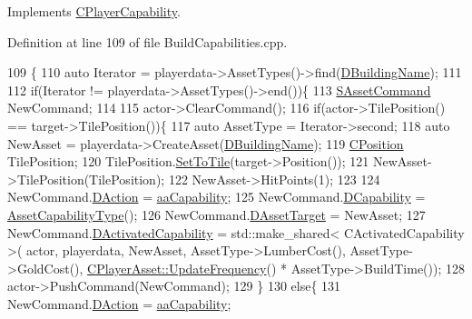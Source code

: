 Implements \hyperlink{classCPlayerCapability_a2ca6fd7fbd9c0178f1cf1d049c63825f}{C\+Player\+Capability}.



Definition at line 109 of file Build\+Capabilities.\+cpp.


\begin{DoxyCode}
109                                                                                                            
                                                               \{
110     \textcolor{keyword}{auto} Iterator = playerdata->AssetTypes()->find(\hyperlink{classCPlayerCapabilityBuildNormal_aae09d6cee5f8e201a0139c9065a5577c}{DBuildingName});
111     
112     \textcolor{keywordflow}{if}(Iterator != playerdata->AssetTypes()->end())\{
113         \hyperlink{structSAssetCommand}{SAssetCommand} NewCommand;
114         
115         actor->ClearCommand();
116         \textcolor{keywordflow}{if}(actor->TilePosition() == target->TilePosition())\{
117             \textcolor{keyword}{auto} AssetType = Iterator->second;
118             \textcolor{keyword}{auto} NewAsset = playerdata->CreateAsset(\hyperlink{classCPlayerCapabilityBuildNormal_aae09d6cee5f8e201a0139c9065a5577c}{DBuildingName});
119             \hyperlink{classCPosition}{CPosition} TilePosition;
120             TilePosition.\hyperlink{classCPosition_ae302aa21792de64c97de29e2cbbfeb94}{SetToTile}(target->Position());
121             NewAsset->TilePosition(TilePosition);
122             NewAsset->HitPoints(1);
123 
124             NewCommand.\hyperlink{structSAssetCommand_a8edd3b3d59a76d5514ba403bc8076a75}{DAction} = \hyperlink{GameDataTypes_8h_ab47668e651a3032cfb9c40ea2d60d670acf9fb164e8abd71c71f4a8c7fda360d4}{aaCapability};
125             NewCommand.\hyperlink{structSAssetCommand_a734ea7c6847457b437360f333f570ff9}{DCapability} = \hyperlink{classCPlayerCapability_a433bb196cd6ab6a932f1cac102b3aa98}{AssetCapabilityType}();
126             NewCommand.\hyperlink{structSAssetCommand_a3d9b43f6e59c386c48c41a65448a0c39}{DAssetTarget} = NewAsset;
127             NewCommand.\hyperlink{structSAssetCommand_ad8beda19520811cc70fe1eab16c774dd}{DActivatedCapability} = std::make\_shared< CActivatedCapability >(
      actor, playerdata, NewAsset, AssetType->LumberCost(), AssetType->GoldCost(), 
      \hyperlink{classCPlayerAsset_a0aff85b9552967a42f4f3f42cb59c19f}{CPlayerAsset::UpdateFrequency}() * AssetType->BuildTime());
128             actor->PushCommand(NewCommand);
129         \}
130         \textcolor{keywordflow}{else}\{
131             NewCommand.\hyperlink{structSAssetCommand_a8edd3b3d59a76d5514ba403bc8076a75}{DAction} = \hyperlink{GameDataTypes_8h_ab47668e651a3032cfb9c40ea2d60d670acf9fb164e8abd71c71f4a8c7fda360d4}{aaCapability};

\end{DoxyCode}

